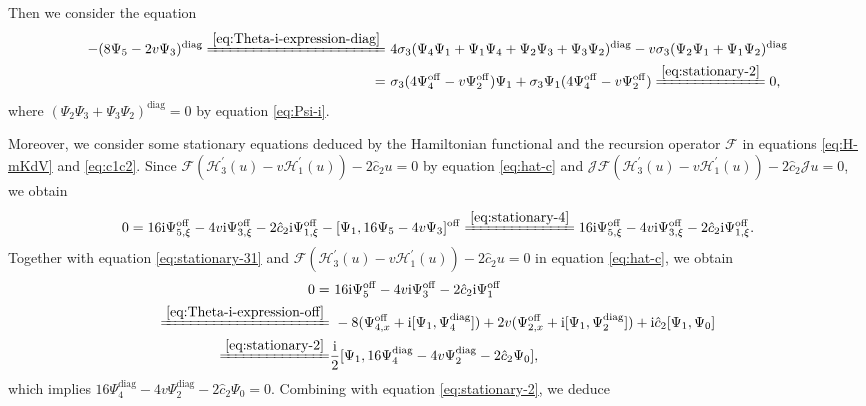 \documentclass[11pt,reqno]{amsart}
\newcommand{\ii}{\mathrm{i}}
\newcommand{\diag}{\mathrm{diag}}
\newcommand{\off}{\mathrm{off}}
\numberwithin{equation}{section}
\begin{document}
\begin{proof-kerin}
Then we consider the equation 
\begin{equation}\label{eq:stationary-4}
	\begin{split}
		-(8\Psi_5-2v\Psi_3)^{\diag}\xlongequal{\eqref{eq:Theta-i-expression-diag}}&\ 4\sigma_3(\Psi_4\Psi_1+\Psi_1\Psi_4+\Psi_2\Psi_3+\Psi_3\Psi_2)^{\diag}-v\sigma_3(\Psi_2\Psi_1+\Psi_1\Psi_2)^{\diag}\\
		=&\ \sigma_3(4\Psi_4^{\off}-v\Psi_2^{\off})\Psi_1+\sigma_3\Psi_1(4\Psi_4^{\off}-v\Psi_2^{\off})\xlongequal{\eqref{eq:stationary-2}}0,
	\end{split}
\end{equation}
where $(\Psi_2\Psi_3+\Psi_3\Psi_2)^{\diag}=0$ by equation \eqref{eq:Psi-i}.


Moreover, we consider some stationary equations deduced by the Hamiltonian functional and the recursion operator $\mathcal{F}$ in equations \eqref{eq:H-mKdV} and \eqref{eq:c1c2}. 
Since $\mathcal{F}(\mathcal{H}^{\prime}_3(u)-v\mathcal{H}^{\prime}_1(u))-2\hat{c}_2u=0$ by equation \eqref{eq:hat-c} and $\mathcal{J}\mathcal{F}(\mathcal{H}^{\prime}_3(u)-v\mathcal{H}^{\prime}_1(u))-2\hat{c}_2\mathcal{J}u=0$, we obtain
\begin{equation}\label{eq:stationary-31}
	0= 16\ii \Psi_{5,\xi}^{\off}-4v\ii \Psi_{3,\xi}^{\off}-2\hat{c}_2\ii \Psi_{1,\xi}^{\off}-[\Psi_1,16 \Psi_{5}-4v \Psi_{3}]^{\off}
	\xlongequal{\eqref{eq:stationary-4}}16\ii \Psi_{5,\xi}^{\off}-4v\ii \Psi_{3,\xi}^{\off}-2\hat{c}_2\ii \Psi_{1,\xi}^{\off}.
\end{equation}
Together with equation \eqref{eq:stationary-31} and $\mathcal{F}(\mathcal{H}^{\prime}_3(u)-v\mathcal{H}^{\prime}_1(u))-2\hat{c}_2u=0$ in equation \eqref{eq:hat-c}, we obtain
\begin{equation}\label{eq:stationary-32}
	\begin{split}
		0=&\ 16\ii \Psi_{5}^{\off}-4v\ii \Psi_{3}^{\off}-2\hat{c}_2\ii \Psi_{1}^{\off}\\
		\xlongequal{\eqref{eq:Theta-i-expression-off}}&\  -8( \Psi_{4,x}^{\off}+\ii[\Psi_1,\Psi_4^{\diag}])+2v( \Psi_{2,x}^{\off}+\ii[\Psi_1,\Psi_2^{\diag}]) +\ii\hat{c}_2 [\Psi_1,\Psi_0]\\
		\xlongequal{\eqref{eq:stationary-2}} &\-\frac{\ii}{2} [\Psi_1,16\Psi_4^{\diag}-4v\Psi_2^{\diag}-2 \hat{c}_2 \Psi_0],
	\end{split}
\end{equation}
which implies $16\Psi_4^{\diag}-4v\Psi_2^{\diag}-2 \hat{c}_2 \Psi_0=0$.
Combining with equation \eqref{eq:stationary-2}, we deduce

\end{proof-kerin}
\end{document}
